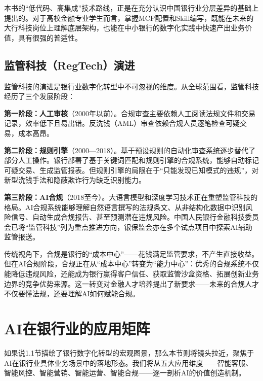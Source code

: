 \begin{notebox}[本书视角]
本书的``低代码、高集成''技术路线，正是在充分认识中国银行业分层差异的基础上提出的。对于高校金融专业学生而言，掌握MCP配置和Skill编写，既能在未来的大行科技岗位上理解底层架构，也能在中小银行的数字化实践中快速产出业务价值，具有很强的普适性。
\end{notebox}

\subsection{监管科技（RegTech）演进}

监管科技的演进是银行业数字化转型中不可忽视的维度。从全球范围看，监管科技经历了三个发展阶段：

\textbf{第一阶段：人工审核}（2000年以前）。合规审查主要依赖人工阅读法规文件和交易记录，效率低下且易出错。反洗钱（AML）审查依赖合规人员逐笔检查可疑交易，成本高昂。

\textbf{第二阶段：规则引擎}（2000—2018）。基于预设规则的自动化审查系统逐步替代了部分人工操作。银行部署了基于关键词匹配和规则引擎的合规系统，能够自动标记可疑交易、生成监管报表。但规则引擎的局限在于``只能发现已知模式的违规''，对新型洗钱手法和隐蔽欺诈行为缺乏识别能力。

\textbf{第三阶段：AI合规}（2018至今）。大语言模型和深度学习技术正在重塑监管科技的格局。AI合规系统能够理解自然语言撰写的法规条文、从非结构化数据中识别风险信号、自动生成合规报告、甚至预测潜在违规风险。中国人民银行金融科技委员会已将``监管科技''列为重点推进方向，银保监会亦在多个试点项目中探索AI辅助监管报送。

\begin{theorybox}[从合规成本到合规能力]
传统视角下，合规是银行的``成本中心''——花钱满足监管要求，不产生直接收益。但在AI合规阶段，合规正在从``成本中心''转变为``能力中心''：优秀的合规系统不仅能降低违规风险，还能成为银行赢得客户信任、获取监管沙盒资格、拓展创新业务边界的竞争优势来源。这一转变对金融人才培养提出了新要求——未来的合规人才不仅要懂法规，还要理解AI如何赋能合规。
\end{theorybox}


\section{AI在银行业的应用矩阵}

如果说1.1节描绘了银行数字化转型的宏观图景，那么本节则将镜头拉近，聚焦于AI在银行业具体业务场景中的落地形态。我们将从五大应用维度——智能客服、智能风控、智能营销、智能运营、智能合规——逐一剖析AI的价值创造机制。

